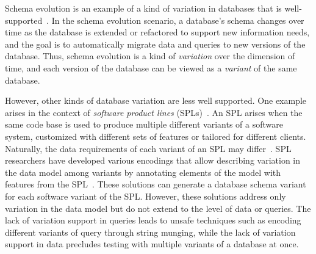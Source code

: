 
Schema evolution is an example of a kind of variation in databases that is
well-supported~\cite{SchEvolRA90McKenzie, schVersioning97Castro,
tempSchEvol91Ariav, tsql95Snodgrass, prima08Moon}.
%
In the schema evolution scenario, a database's schema changes over time as the
database is extended or refactored to support new information needs, and the
goal is to automatically migrate data and queries to new versions of the
database. Thus, schema evolution is a kind of \emph{variation} over the
dimension of time, and each version of the database can be viewed as a
\emph{variant} of the same database.
%


However, other kinds of database variation are less well supported. One example
arises in the context of \emph{software product lines} (SPLs)~\cite{fospl}. An
SPL arises when the same code base is used to produce multiple different
variants of a software system, customized with different sets of features or
tailored for different clients. Naturally, the data requirements of each
variant of an SPL may differ~\cite{skrhas09DBIS}.
%
SPL researchers have developed various encodings that allow describing
variation in the data model among variants by annotating elements of the model
with features from the SPL~\cite{skrhas09DBIS,slrs12CAiSE,ad11varDataModel}.
These solutions can generate a database schema variant for each software
variant of the SPL. 
%
However, these solutions address only variation in the data model but do not
extend to the level of data or queries. The lack of variation support in
queries leads to unsafe techniques such as encoding different variants of query
through string munging, while the lack of variation support in data precludes
testing with multiple variants of a database at once.

